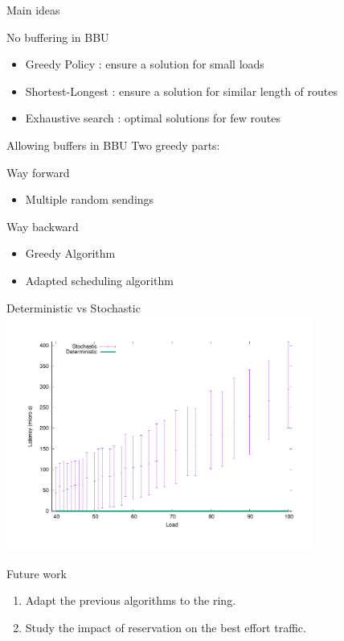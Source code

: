 \documentclass[10 pt]{beamer}
\begin{document}
\begin{frame}{Main ideas}

\begin{block}{No buffering in BBU}
\begin{itemize}
\item Greedy Policy : ensure a solution for small loads
\item Shortest-Longest : ensure a solution for similar length of routes
\item Exhaustive search : optimal solutions for few routes
\end{itemize}

\end{block}

\begin{block}{Allowing buffers in BBU}
Two greedy parts: 

 \begin{multicols}{2}
 Way forward
\begin{itemize}
\item Multiple random sendings
\end{itemize}
\vspace{0.5cm}
Way backward
\begin{itemize}
\item Greedy Algorithm
\item Adapted scheduling algorithm
\end{itemize}
\end{multicols}
\vspace{1cm}
\end{block}

\end{frame}

\begin{frame}{Deterministic vs Stochastic}
\centering
\includegraphics [width=100mm]{stochastic.pdf}
\end{frame}

\begin{frame}{Future work}

\begin{enumerate}
\item Adapt the previous algorithms to the ring.
\item Study the impact of reservation on the best effort traffic.
\end{enumerate}
\end{frame}
\end{document}
